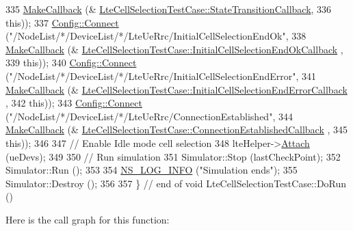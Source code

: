 \begin{DoxyCode}
335                    \hyperlink{group__makecallbackmemptr_ga9376283685aa99d204048d6a4b7610a4}{MakeCallback} (&
      \hyperlink{classLteCellSelectionTestCase_af32c056747497954d3757c33ee9ecf0a}{LteCellSelectionTestCase::StateTransitionCallback},
336                                  \textcolor{keyword}{this}));
337   \hyperlink{group__config_ga4014f151241cd0939b6cb64409605736}{Config::Connect} (\textcolor{stringliteral}{"/NodeList/*/DeviceList/*/LteUeRrc/InitialCellSelectionEndOk"},
338                    \hyperlink{group__makecallbackmemptr_ga9376283685aa99d204048d6a4b7610a4}{MakeCallback} (&
      \hyperlink{classLteCellSelectionTestCase_a1356f0354e8a62c7078a325bc71c9f32}{LteCellSelectionTestCase::InitialCellSelectionEndOkCallback}
      ,
339                                  \textcolor{keyword}{this}));
340   \hyperlink{group__config_ga4014f151241cd0939b6cb64409605736}{Config::Connect} (\textcolor{stringliteral}{"/NodeList/*/DeviceList/*/LteUeRrc/InitialCellSelectionEndError"},
341                    \hyperlink{group__makecallbackmemptr_ga9376283685aa99d204048d6a4b7610a4}{MakeCallback} (&
      \hyperlink{classLteCellSelectionTestCase_adb7a5645850282a9a8782206c28f1799}{LteCellSelectionTestCase::InitialCellSelectionEndErrorCallback}
      ,
342                                  \textcolor{keyword}{this}));
343   \hyperlink{group__config_ga4014f151241cd0939b6cb64409605736}{Config::Connect} (\textcolor{stringliteral}{"/NodeList/*/DeviceList/*/LteUeRrc/ConnectionEstablished"},
344                    \hyperlink{group__makecallbackmemptr_ga9376283685aa99d204048d6a4b7610a4}{MakeCallback} (&
      \hyperlink{classLteCellSelectionTestCase_a79d10a85379d39ecc6acef811de6c547}{LteCellSelectionTestCase::ConnectionEstablishedCallback}
      ,
345                                  \textcolor{keyword}{this}));
346 
347   \textcolor{comment}{// Enable Idle mode cell selection}
348   lteHelper->\hyperlink{classns3_1_1LteHelper_a9466743f826aa2652a87907b7f0a1c87}{Attach} (ueDevs);
349 
350   \textcolor{comment}{// Run simulation}
351   Simulator::Stop (lastCheckPoint);
352   Simulator::Run ();
353 
354   \hyperlink{group__logging_gafbd73ee2cf9f26b319f49086d8e860fb}{NS\_LOG\_INFO} (\textcolor{stringliteral}{"Simulation ends"});
355   Simulator::Destroy ();
356 
357 \} \textcolor{comment}{// end of void LteCellSelectionTestCase::DoRun ()}
\end{DoxyCode}


Here is the call graph for this function\+:


